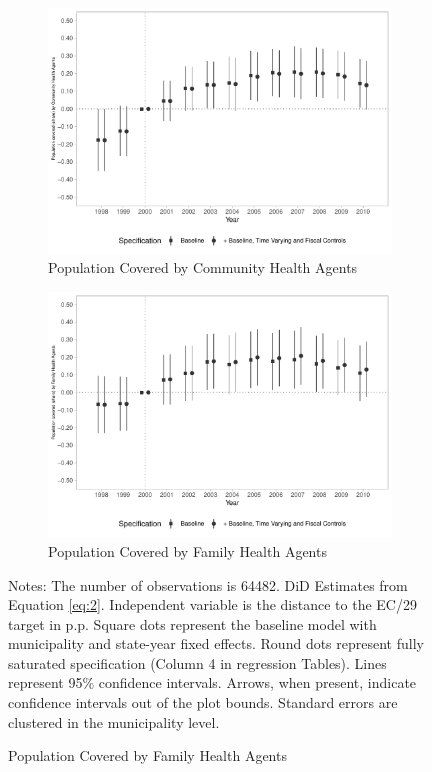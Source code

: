\begin{figure}[h!]
    \begin{center}
    \caption{Effects on Primary Care Coverage - Extensive Margin}\label{fig:8}
    \begin{subfigure}{0.48\textwidth}
        \centering
        \caption{\scriptsize Population Covered by Community Health Agents}\label{fig:8a}
        \includegraphics[width=\textwidth]{plots/ACS_popprop_dist_ec29_baseline_dist_ec29_baseline_8.pdf}
    \end{subfigure}
    \begin{subfigure}{0.48\textwidth}
        \centering
        \caption{\scriptsize Population Covered by Family Health Agents}\label{fig:8b}
        \includegraphics[width=\textwidth]{plots/eSF_popprop_dist_ec29_baseline_dist_ec29_baseline_8.pdf}
    \end{subfigure}
    
    \end{center}
        \scriptsize{Notes: The number of observations is 64482. DiD Estimates from Equation \ref{eq:2}. Independent variable is the distance to the EC/29 target in p.p. Square dots represent the baseline model with municipality and state-year fixed effects. Round dots represent fully saturated specification (Column 4 in regression Tables). Lines represent 95\% confidence intervals. Arrows, when present, indicate confidence intervals out of the plot bounds. Standard errors are clustered in the municipality level.}
    
\end{figure}
